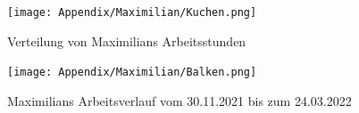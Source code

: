 \begin{figure}[H]
    \begin{center}
        \texttt{[image: Appendix/Maximilian/Kuchen.png]}
        \caption{Verteilung von Maximilians Arbeitsstunden}
    \end{center}
\end{figure}

\begin{figure}[H]
    \begin{center}
        \texttt{[image: Appendix/Maximilian/Balken.png]}
        \caption{Maximilians Arbeitsverlauf vom 30.11.2021 bis zum 24.03.2022}
    \end{center}
\end{figure}
